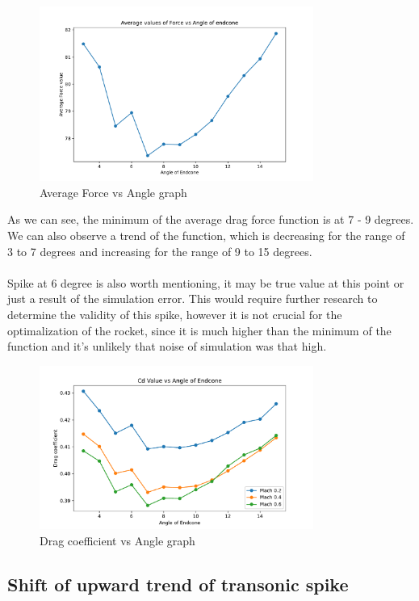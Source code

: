 \documentclass{article}
\begin{document}
\begin{figure}[H]
    \centering
    \includegraphics[width=0.8\textwidth]{../data/R6-Parametric-Endcone/ForceVsAngle.pdf}
    \caption{Average Force vs Angle graph}
\end{figure}
As we can see, the minimum of the average drag force function is at 7 - 9 degrees. We can also 
observe a trend of the function, which is decreasing for the range of 3 to 7 degrees and increasing
for the range of 9 to 15 degrees.\\\\
Spike at 6 degree is also worth mentioning, it may be true value at this point or just a result of
the simulation error. This would require further research to determine the validity of this spike, however 
it is not crucial for the optimalization of the rocket, since it is much higher than the minimum 
of the function and it's unlikely that noise of simulation was that high.

\begin{figure}[H]
    \centering
    \includegraphics[width=0.8\textwidth]{../data/R6-Parametric-Endcone/CdVsAngle.pdf}
    \caption{Drag coefficient vs Angle graph}
\end{figure}

\subsection{Shift of upward trend of transonic spike}
\end{document}
